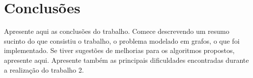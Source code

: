 \documentclass[12pt]{article}
\begin{document}
\section{Conclusões}
\label{secConclusoes}

Apresente aqui as conclusões do trabalho. Comece descrevendo um resumo sucinto do que consistiu o trabalho, o problema modelado em grafos, o que foi implementado. Se tiver sugestões de melhorias para os algoritmos propostos, apresente aqui. Apresente também as principais dificuldades encontradas durante a realização do trabalho 2.



\end{document}
